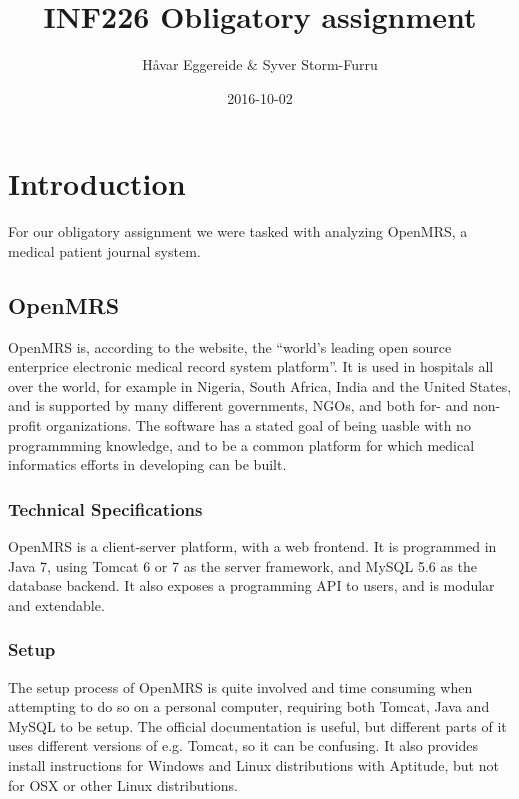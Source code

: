 \documentclass{article}
\title{INF226 Obligatory assignment}
\date{2016-10-02}
\author{Håvar Eggereide & Syver Storm-Furru}
\begin{document}
\maketitle
{}
\newpage
{}
\section{Introduction}

  For our obligatory assignment we were tasked with analyzing OpenMRS, a medical
  patient journal system.

\subsection{OpenMRS}

  OpenMRS is, according to the website, the ``world's leading open source
  enterprice electronic medical record system platform''. It is used in
  hospitals all over the world, for example in Nigeria, South Africa, India
  and the United States, and is supported by many different governments, NGOs,
  and both for- and non-profit organizations. The software has a stated goal of
  being uasble with no programmming knowledge, and to be a common platform for
  which medical informatics efforts in developing can be built.

  \subsubsection{Technical Specifications}

  OpenMRS is a client-server platform, with a web frontend. It is programmed in
  Java 7, using Tomcat 6 or 7 as the server framework, and MySQL 5.6 as the
  database backend. It also exposes a programming API to users, and is modular
  and extendable.

\subsubsection{Setup}

  The setup process of OpenMRS is quite involved and time consuming when
  attempting to do so on a personal computer, requiring both Tomcat, Java and
  MySQL to be setup. The official documentation is useful, but different parts
  of it uses different versions of e.g. Tomcat, so it can be confusing.
  It also provides install instructions for Windows and Linux distributions
  with Aptitude, but not for OSX or other Linux distributions. 
\end{document}
